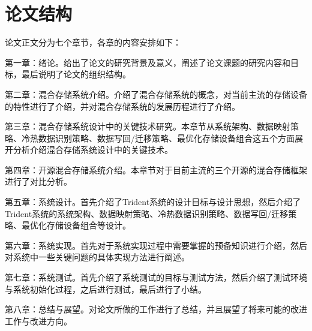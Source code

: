 \section{论文结构}

论文正文分为七个章节，各章的内容安排如下： 

第一章：绪论。给出了论文的研究背景及意义，阐述了论文课题的研究内容和目标，最后说明了论文的组织结构。 

第二章：混合存储系统介绍。介绍了混合存储系统的概念，对当前主流的存储设备的特性进行了介绍，并对混合存储系统的发展历程进行了介绍。 

第三章：混合存储系统设计中的关键技术研究。本章节从系统架构、数据映射策略、冷热数据识别策略、数据写回/迁移策略、最优化存储设备组合这五个方面展开分析介绍混合存储系统设计中的关键技术。 

第四章：开源混合存储系统介绍。本章节对于目前主流的三个开源的混合存储框架进行了对比分析。

第五章：系统设计。首先介绍了Trident系统的设计目标与设计思想，然后介绍了Trident系统的系统架构、数据映射策略、冷热数据识别策略、数据写回/迁移策略、最优化存储设备组合等设计。 

第六章：系统实现。首先对于系统实现过程中需要掌握的预备知识进行介绍，然后对系统中一些关键问题的具体实现方法进行阐述。 

第七章：系统测试。首先介绍了系统测试的目标与测试方法，然后介绍了测试环境与系统初始化过程，之后进行测试，最后进行了小结。 

第八章：总结与展望。对论文所做的工作进行了总结，并且展望了将来可能的改进工作与改进方向。

